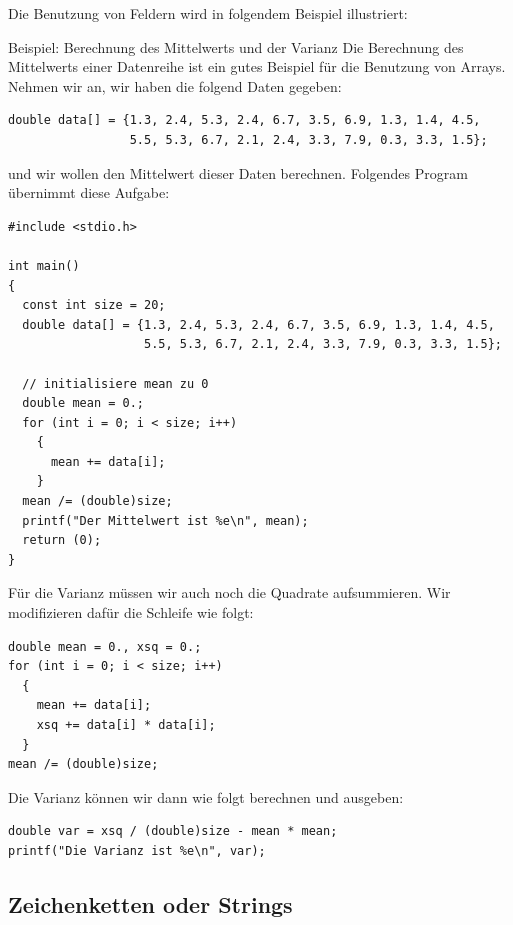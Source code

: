 Die Benutzung von Feldern wird in folgendem Beispiel illustriert:
\begin{myexampleprogram}{Beispiel: Berechnung des Mittelwerts und der Varianz}
  Die Berechnung des Mittelwerts einer Datenreihe ist ein gutes Beispiel für die Benutzung von Arrays.
  Nehmen wir an, wir haben die folgend Daten gegeben:
\begin{lstlisting}
double data[] = {1.3, 2.4, 5.3, 2.4, 6.7, 3.5, 6.9, 1.3, 1.4, 4.5,
                 5.5, 5.3, 6.7, 2.1, 2.4, 3.3, 7.9, 0.3, 3.3, 1.5};
\end{lstlisting}
  und wir wollen den Mittelwert dieser Daten berechnen.
  Folgendes Program übernimmt diese Aufgabe:
\begin{lstlisting}
#include <stdio.h>

int main()
{
  const int size = 20;
  double data[] = {1.3, 2.4, 5.3, 2.4, 6.7, 3.5, 6.9, 1.3, 1.4, 4.5,
                   5.5, 5.3, 6.7, 2.1, 2.4, 3.3, 7.9, 0.3, 3.3, 1.5};

  // initialisiere mean zu 0
  double mean = 0.;
  for (int i = 0; i < size; i++)
    {
      mean += data[i];
    }
  mean /= (double)size;
  printf("Der Mittelwert ist %e\n", mean);
  return (0);
}
\end{lstlisting}
  Für die Varianz müssen wir auch noch die Quadrate aufsummieren.
  Wir modifizieren dafür die Schleife wie folgt:
\begin{lstlisting}
double mean = 0., xsq = 0.;
for (int i = 0; i < size; i++)
  {
    mean += data[i];
    xsq += data[i] * data[i];
  }
mean /= (double)size;
\end{lstlisting}
  Die Varianz können wir dann wie folgt berechnen und ausgeben:
\begin{lstlisting}
double var = xsq / (double)size - mean * mean;
printf("Die Varianz ist %e\n", var);
\end{lstlisting}
\end{myexampleprogram}
\newpage

\subsection{Zeichenketten oder Strings}

